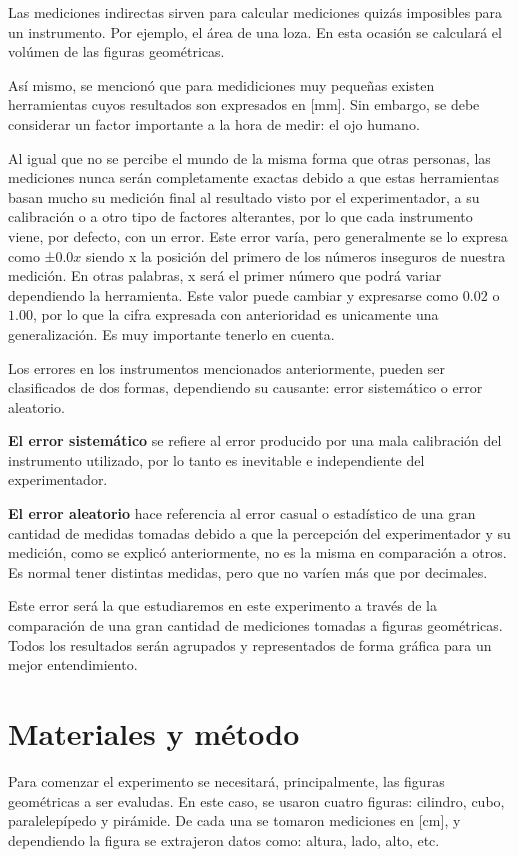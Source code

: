 \documentclass[%
 reprint,
groupedaddress,
unsortedaddress,
 amsmath,amssymb,
 aps,
superscriptaddress
]{revtex4-2}
\begin{document}
Las mediciones indirectas sirven para calcular mediciones quizás imposibles para un instrumento. Por ejemplo, el área de una loza. En esta ocasión se calculará el volúmen de las figuras geométricas.  

Así mismo, se mencionó que para medidiciones muy pequeñas existen herramientas cuyos resultados son expresados en [mm]. Sin embargo, se debe considerar un factor importante a la hora de medir: el ojo humano. 

Al igual que no se percibe el mundo de la misma forma que otras personas, las mediciones nunca serán completamente exactas debido a que estas herramientas basan mucho su medición final al resultado visto por el experimentador, a su calibración o a otro tipo de factores alterantes, por lo que cada instrumento viene, por defecto, con un error. Este error varía, pero generalmente se lo expresa como ±$0.0x$ siendo x la posición del primero de los números inseguros de nuestra medición. En otras palabras, x será el primer número que podrá variar dependiendo la herramienta. Este valor puede cambiar y expresarse como $0.02$ o $1.00$, por lo que la cifra expresada con anterioridad es unicamente una generalización. Es muy importante tenerlo en cuenta.


Los errores en los instrumentos mencionados anteriormente, pueden ser clasificados de dos formas, dependiendo su causante: error sistemático o error aleatorio.


\textbf{El error sistemático} se refiere al error producido por una mala calibración del instrumento utilizado, por lo tanto es inevitable e independiente del experimentador.

\textbf{El error aleatorio} hace referencia al error casual o estadístico de una gran cantidad de medidas tomadas debido a que la percepción del experimentador y su medición, como se explicó anteriormente, no es la misma en comparación a otros. Es normal tener distintas medidas, pero que no varíen más que por decimales.

Este error será la que estudiaremos en este experimento a través de la comparación de una gran cantidad de mediciones tomadas a figuras geométricas. Todos los resultados serán agrupados y representados de forma gráfica para un mejor entendimiento.


\section{Materiales y método}
\label{sec:met}
Para comenzar el experimento se necesitará, principalmente, las figuras geométricas a ser evaludas. En este caso, se usaron cuatro figuras: cilindro, cubo, paralelepípedo y pirámide. De cada una se tomaron mediciones en [cm], y dependiendo la figura se extrajeron datos como: altura, lado, alto, etc.
\end{document}
